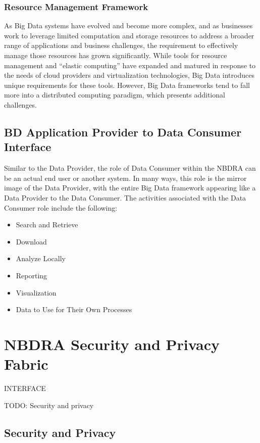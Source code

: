 \documentclass[11pt]{article}
\begin{document}
\subsubsection{Resource Management Framework}

As Big Data systems have evolved and become more complex, and as businesses work to leverage limited 
computation and storage resources to address a broader range of applications and business challenges, the 
requirement to effectively manage those resources has grown significantly. While tools for resource 
management and “elastic computing” have expanded and matured in response to the needs of cloud 
providers and virtualization technologies, Big Data introduces unique requirements for these tools. 
However, Big Data frameworks tend to fall more into a distributed computing paradigm, which presents 
additional challenges. 

\subsection{BD Application Provider to Data Consumer Interface}

Similar to the Data Provider, the role of Data Consumer within the NBDRA can be an actual end user or 
another system. In many ways, this role is the mirror image of the Data Provider, with the entire Big Data 
framework appearing like a Data Provider to the Data Consumer. The activities associated with the Data 
Consumer role include the following:

\begin{itemize}
\item	Search and Retrieve
\item	Download
\item	Analyze Locally
\item	Reporting
\item	Visualization
\item	Data to Use for Their Own Processes
\end{itemize}


\section{NBDRA Security and Privacy Fabric}

INTERFACE

TODO: Security and privacy

\subsection{Security and Privacy}
\end{document}
